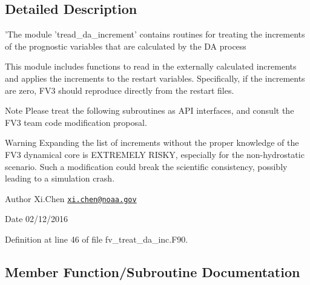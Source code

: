 \subsection{Detailed Description}
'The module 'tread\-\_\-da\-\_\-increment' contains routines for treating the increments of the prognostic variables that are calculated by the D\-A process 

This module includes functions to read in the externally calculated increments and applies the increments to the restart variables. Specifically, if the increments are zero, F\-V3 should reproduce directly from the restart files. \begin{DoxyNote}{Note}
Please treat the following subroutines as A\-P\-I interfaces, and consult the F\-V3 team code modification proposal. 
\end{DoxyNote}
\begin{DoxyWarning}{Warning}
Expanding the list of increments without the proper knowledge of the F\-V3 dynamical core is E\-X\-T\-R\-E\-M\-E\-L\-Y R\-I\-S\-K\-Y, especially for the non-\/hydrostatic scenario. Such a modification could break the scientific consistency, possibly leading to a simulation crash. 
\end{DoxyWarning}
\begin{DoxyAuthor}{Author}
Xi.\-Chen \href{mailto:xi.chen@noaa.gov}{\tt xi.\-chen@noaa.\-gov} 
\end{DoxyAuthor}
\begin{DoxyDate}{Date}
02/12/2016 
\end{DoxyDate}


Definition at line 46 of file fv\-\_\-treat\-\_\-da\-\_\-inc.\-F90.



\subsection{Member Function/\-Subroutine Documentation}
